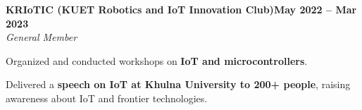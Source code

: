 \documentclass[letterpaper,10pt]{article}
\newcommand{\heading}[2]{
  \hspace{10pt}#1\hfill#2\\
}
\newcommand{\headingBf}[2]{
  \heading{\textbf{#1}}{\textbf{#2}}
}
\newcommand{\headingIt}[2]{
  \heading{\textit{#1}}{\textit{#2}}
}
\newenvironment{resume_list}{
  \vspace{-7pt}
  \begin{itemize}[itemsep=-2px, parsep=1pt, leftmargin=30pt]
}{
  \end{itemize}
}
\begin{document}
  \headingBf{KRIoTIC (KUET Robotics and IoT Innovation Club)}{May 2022 -- Mar 2023}
  \headingIt{General Member}{}
  \begin{resume_list}
    \item Organized and conducted workshops on \textbf{IoT and microcontrollers}.
    \item Delivered a \textbf{speech on IoT at Khulna University to 200+ people}, raising awareness about IoT and frontier technologies.
  \end{resume_list}




  



  
\end{document}
